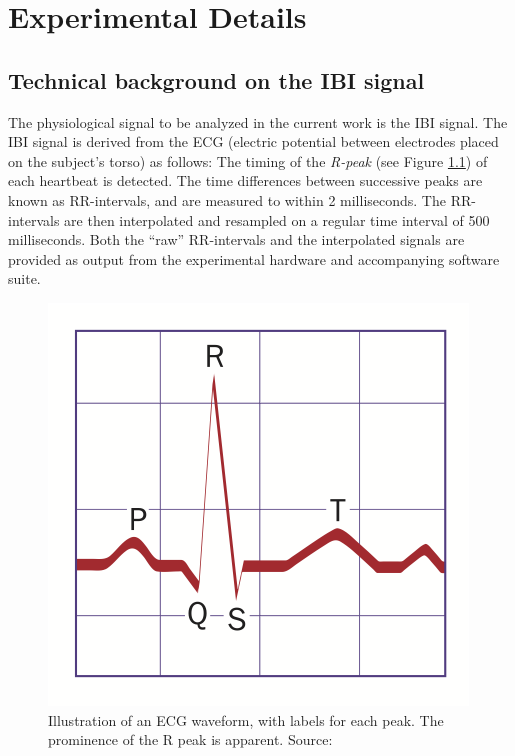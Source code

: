 \documentclass[a4paper, 11pt]{report}      %
\begin{document}
\vspace{1cm}



\appendix
\chapter{Experimental Details}
\section{Technical background on the IBI signal}
The physiological signal to be analyzed in the current work is the IBI signal. The IBI signal is derived from the ECG (electric potential between electrodes placed on the subject's torso) as follows: The timing of the \emph{R-peak} (see Figure \ref{fig:qrs}) of each heartbeat is detected. The time differences between successive peaks are known as RR-intervals, and are measured to within 2 milliseconds. The RR-intervals are then interpolated and resampled on a regular time interval of 500 milliseconds. 
Both the \enquote{raw} RR-intervals and the interpolated signals are provided as output from the experimental hardware and accompanying software suite.

\begin{figure}
    \centering
    \includegraphics[scale=0.3]{normalqrs_simplelabels.png}
    \caption{Illustration of an ECG waveform, with labels for each peak. The prominence of the R peak is apparent. Source: \cite{HealioQRSChart}}
    \label{fig:qrs}
\end{figure}
\end{document}
